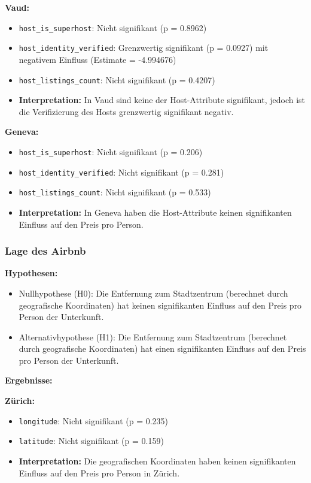 \documentclass[
  journal,
]{IEEEtran}%
\providecommand{\tightlist}{%
  \setlength{\itemsep}{0pt}\setlength{\parskip}{0pt}}\usepackage{longtable,booktabs,array}
\begin{document}
\textbf{Vaud:}

\begin{itemize}
\item
  \texttt{host\_is\_superhost}: Nicht signifikant (p = 0.8962)
\item
  \texttt{host\_identity\_verified}: Grenzwertig signifikant (p =
  0.0927) mit negativem Einfluss (Estimate = -4.994676)
\item
  \texttt{host\_listings\_count}: Nicht signifikant (p = 0.4207)
\item
  \textbf{Interpretation:} In Vaud sind keine der Host-Attribute
  signifikant, jedoch ist die Verifizierung des Hosts grenzwertig
  signifikant negativ.
\end{itemize}

\textbf{Geneva:}

\begin{itemize}
\item
  \texttt{host\_is\_superhost}: Nicht signifikant (p = 0.206)
\item
  \texttt{host\_identity\_verified}: Nicht signifikant (p = 0.281)
\item
  \texttt{host\_listings\_count}: Nicht signifikant (p = 0.533)
\item
  \textbf{Interpretation:} In Geneva haben die Host-Attribute keinen
  signifikanten Einfluss auf den Preis pro Person.
\end{itemize}

\hypertarget{lage-des-airbnb}{%
\subsubsection{Lage des Airbnb}\label{lage-des-airbnb}}

\textbf{Hypothesen:}

\begin{itemize}
\tightlist
\item
  Nullhypothese (H0): Die Entfernung zum Stadtzentrum (berechnet durch
  geografische Koordinaten) hat keinen signifikanten Einfluss auf den
  Preis pro Person der Unterkunft.
\item
  Alternativhypothese (H1): Die Entfernung zum Stadtzentrum (berechnet
  durch geografische Koordinaten) hat einen signifikanten Einfluss auf
  den Preis pro Person der Unterkunft.
\end{itemize}

\textbf{Ergebnisse:}

\textbf{Zürich:}

\begin{itemize}
\item
  \texttt{longitude}: Nicht signifikant (p = 0.235)
\item
  \texttt{latitude}: Nicht signifikant (p = 0.159)
\item
  \textbf{Interpretation:} Die geografischen Koordinaten haben keinen
  signifikanten Einfluss auf den Preis pro Person in Zürich.
\end{itemize}
\end{document}
